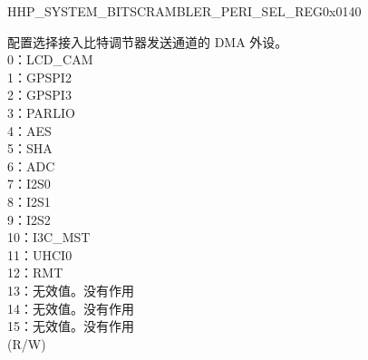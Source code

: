 \begin{register}{H}{HP\_SYSTEM\_BITSCRAMBLER\_PERI\_SEL\_REG}{0x0140}
\begin{regdesc}\begin{reglist}
\item [接上页...]
\label{fielddesc:HPSYSTEMBITSCRAMBLERPERITXSEL}\item [HP\_SYSTEM\_BITSCRAMBLER\_PERI\_TX\_SEL] 配置选择接入比特调节器发送通道的 DMA 外设。\\
0：LCD\_CAM \\
1：GPSPI2 \\
2：GPSPI3 \\
3：PARLIO \\
4：AES \\
5：SHA \\
6：ADC \\
7：I2S0 \\
8：I2S1 \\
9：I2S2 \\
10：I3C\_MST \\
11：UHCI0 \\
12：RMT \\
13：无效值。没有作用\\
14：无效值。没有作用\\
15：无效值。没有作用\\
(R/W)
\end{reglist}\end{regdesc}
\end{register}


